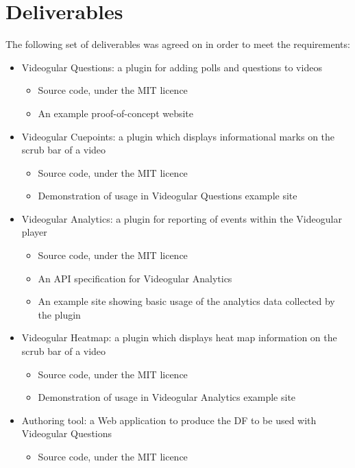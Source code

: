 \section{Deliverables}
\label{Section:Deliverables}

The following set of deliverables was agreed on in order to meet the requirements:

\begin{itemize}
	\item Videogular Questions: a plugin for adding polls and questions to videos
		\begin{itemize}
			\item Source code, under the MIT licence
			\item An example proof-of-concept website
		\end{itemize}
	\item Videogular Cuepoints: a plugin which displays informational marks on the \gls{scrub bar} of a video
		\begin{itemize}
			\item Source code, under the MIT licence
			\item Demonstration of usage in Videogular Questions example site
		\end{itemize}
	\item Videogular Analytics: a plugin for reporting of events within the Videogular player
		\begin{itemize}
			\item Source code, under the MIT licence
			\item An API specification for Videogular Analytics
			\item An example site showing basic usage of the analytics data collected by the plugin
		\end{itemize}
	\item Videogular Heatmap: a plugin which displays heat map information on the \gls{scrub bar} of a video
		\begin{itemize}
			\item Source code, under the MIT licence
			\item Demonstration of usage in Videogular Analytics example site
		\end{itemize}
	\item Authoring tool: a Web application to produce the \gls{DF} to be used with Videogular Questions
		\begin{itemize}
			\item Source code, under the MIT licence
		\end{itemize}
\end{itemize}


